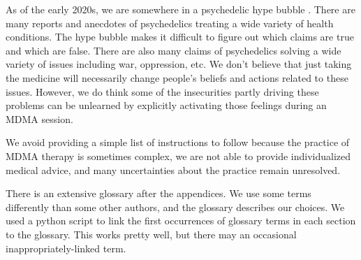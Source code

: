 \documentclass[12pt,letterpaper]{book}
\begin{document}
As of the early 2020s, we are somewhere in a psychedelic hype bubble \cite{yaden2022preparing}. There are many reports and anecdotes of psychedelics treating a wide variety of health conditions. The hype bubble makes it difficult to figure out which claims are true and which are false. There are also many claims of psychedelics solving a wide variety of issues including war, oppression, etc. We don't believe that just taking the medicine will necessarily change people's beliefs and actions related to these issues. However, we do think some of the insecurities partly driving these problems can be unlearned by explicitly activating those feelings during an MDMA session.



We avoid providing a simple list of instructions to follow because the practice of MDMA therapy is sometimes complex, we are not able to provide individualized medical advice, and many uncertainties about the practice remain unresolved.

There is an extensive glossary after the appendices. We use some terms differently than some other authors, and the glossary describes our choices. We used a python script to link the first occurrences of glossary terms in each section to the glossary. This works pretty well, but there may an occasional inappropriately-linked term.
\end{document}
